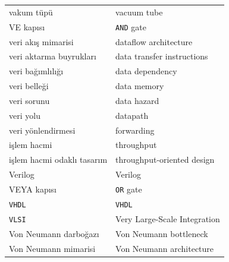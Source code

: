 {\begin{longtable}{@{}p{7.6cm}p{7.6cm}@{}}
vakum tüpü & vacuum tube \\
VE kapısı & \texttt{AND} gate \\
veri akış mimarisi & dataflow architecture \\
veri aktarma buyrukları & data transfer instructions \\
veri bağımlılığı & data dependency \\
veri belleği & data memory \\
veri sorunu & data hazard \\
veri yolu & datapath \\
veri yönlendirmesi & forwarding \\
işlem hacmi & throughput \\
işlem hacmi odaklı tasarım & throughput-oriented design \\
Verilog & Verilog \\
VEYA kapısı & \texttt{OR} gate \\
\texttt{VHDL} & \texttt{VHDL} \\
\texttt{VLSI} & Very Large-Scale Integration \\
Von Neumann darboğazı & Von Neumann bottleneck \\
Von Neumann mimarisi & Von Neumann architecture \\


\end{longtable}}
